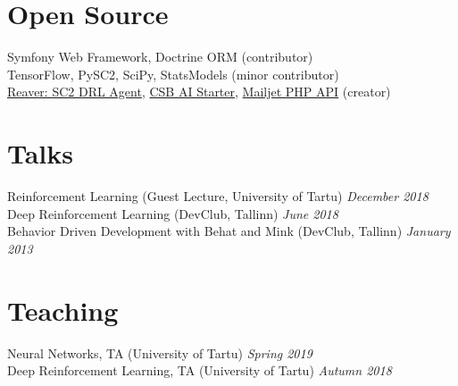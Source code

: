 \documentclass[margin,line]{res}
\begin{document}
\begin{resume}

\section{\sc Open Source}
Symfony Web Framework, Doctrine ORM (contributor)\vspace*{+.05in}\\
TensorFlow, PySC2, SciPy, StatsModels (minor contributor)\vspace*{+.05in}\\
\href{https://github.com/Inoryy/reaver-pysc2}{Reaver: SC2 DRL Agent}, \href{https://github.com/Inoryy/csb-ai-starter}{CSB AI Starter}, \href{https://github.com/KnpLabs/mailjet-api-php}{Mailjet PHP API} (creator)

\section{\sc Talks}
Reinforcement Learning (Guest Lecture, University of Tartu) \hfill {\it December 2018}\vspace*{+.05in}\\
Deep Reinforcement Learning (DevClub, Tallinn) \hfill {\it June 2018}\vspace*{+.05in}\\
Behavior Driven Development with Behat and Mink (DevClub, Tallinn) \hfill {\it January 2013}

\section{\sc Teaching}
Neural Networks, TA (University of Tartu) \hfill {\it Spring 2019}\\
Deep Reinforcement Learning, TA (University of Tartu) \hfill {\it Autumn 2018}


\end{resume}
\end{document}
